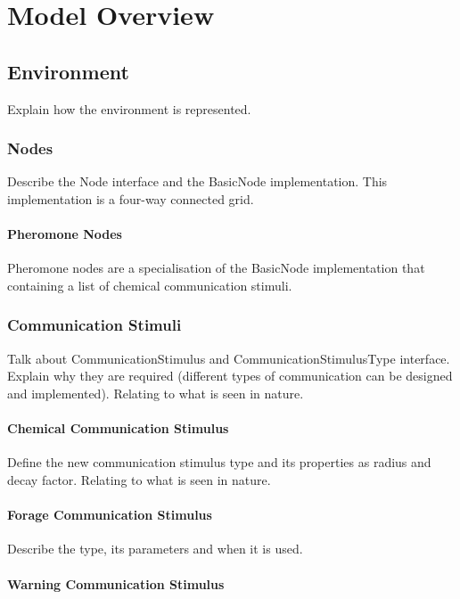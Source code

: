 \chapter{Model Overview}
\label{ch:model-overview}

\section{Environment}

Explain how the environment is represented.

\subsection{Nodes}

Describe the Node interface and the BasicNode implementation. This implementation is a four-way connected grid.

\subsubsection{Pheromone Nodes}

Pheromone nodes are a specialisation of the BasicNode implementation that containing a list of chemical communication stimuli.

\subsection {Communication Stimuli}

Talk about CommunicationStimulus and CommunicationStimulusType interface. 
Explain why they are required (different types of communication can be designed and implemented). Relating to what is seen in nature.

\subsubsection{Chemical Communication Stimulus}

Define the new communication stimulus type and its properties as radius and decay factor. Relating to what is seen in nature.

\subsubsection {Forage Communication Stimulus}

Describe the type, its parameters and when it is used.

\subsubsection {Warning Communication Stimulus}

